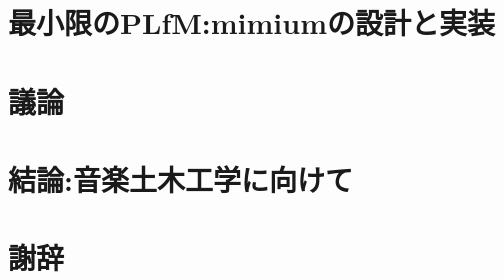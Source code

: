 \documentclass[luatex,unicode,titlepage,pdfusetitle,a4paper,openany]{ltjsbook}
\begin{document}
\chapter{最小限のPLfM:mimiumの設計と実装}\label{sec:chapter6}


\chapter{議論}\label{sec:chapter7}


\chapter{結論:音楽土木工学に向けて}\label{sec:chapter8}


\printbibliography[title = 参考文献]

\chapter*{謝辞}

\end{document}
